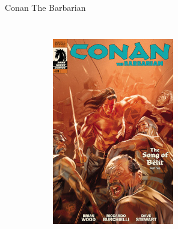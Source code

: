 \begin{frame}{Conan The Barbarian}
\begin{columns}
\begin{figure}[htp]
\begin{subfigure}[b]{0.23\textwidth}
				\includegraphics[width=\textwidth]{img/DH-CTB-23}
			\end{subfigure}
			~
			\begin{subfigure}[b]{0.23\textwidth}

\end{subfigure}
\end{figure}
\end{columns}
\end{frame}
